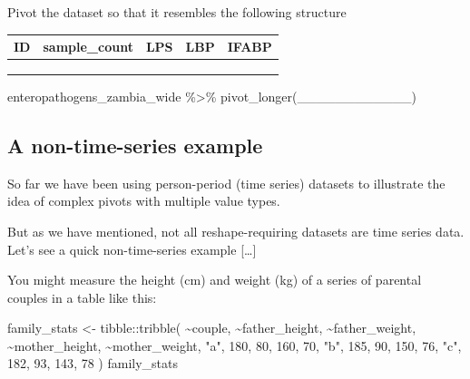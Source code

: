 \documentclass[
  letterpaper,
  DIV=11,
  numbers=noendperiod]{scrreprt}
\newenvironment{Shaded}{\begin{snugshade}}{\end{snugshade}}
\newcommand{\DecValTok}[1]{\textcolor[rgb]{0.68,0.00,0.00}{#1}}
\newcommand{\FunctionTok}[1]{\textcolor[rgb]{0.28,0.35,0.67}{#1}}
\newcommand{\NormalTok}[1]{\textcolor[rgb]{0.00,0.23,0.31}{#1}}
\newcommand{\OtherTok}[1]{\textcolor[rgb]{0.00,0.23,0.31}{#1}}
\newcommand{\SpecialCharTok}[1]{\textcolor[rgb]{0.37,0.37,0.37}{#1}}
\newcommand{\StringTok}[1]{\textcolor[rgb]{0.13,0.47,0.30}{#1}}
\begin{document}
\begin{tcolorbox}
Pivot the dataset so that it resembles the following structure

\begin{longtable}[]{@{}lllll@{}}
\toprule\noalign{}
ID & sample\_count & LPS & LBP & IFABP \\
\midrule\noalign{}
\endhead
\bottomrule\noalign{}
\endlastfoot
& & & & \\
& & & & \\
& & & & \\
\end{longtable}

\begin{Shaded}
\begin{Highlighting}[]
\NormalTok{enteropathogens\_zambia\_wide }\SpecialCharTok{\%\textgreater{}\%} 
   \FunctionTok{pivot\_longer}\NormalTok{(\_\_\_\_\_\_\_\_\_\_\_\_)}
\end{Highlighting}
\end{Shaded}

\end{tcolorbox}

\subsection{A non-time-series example}\label{a-non-time-series-example}

So far we have been using person-period (time series) datasets to
illustrate the idea of complex pivots with multiple value types.

But as we have mentioned, not all reshape-requiring datasets are time
series data. Let's see a quick non-time-series example {[}\ldots{]}

You might measure the height (cm) and weight (kg) of a series of
parental couples in a table like this:

\begin{Shaded}
\begin{Highlighting}[]
\NormalTok{family\_stats }\OtherTok{\textless{}{-}} 
\NormalTok{  tibble}\SpecialCharTok{::}\FunctionTok{tribble}\NormalTok{(}
  \SpecialCharTok{\textasciitilde{}}\NormalTok{couple, }\SpecialCharTok{\textasciitilde{}}\NormalTok{father\_height, }\SpecialCharTok{\textasciitilde{}}\NormalTok{father\_weight, }\SpecialCharTok{\textasciitilde{}}\NormalTok{mother\_height, }\SpecialCharTok{\textasciitilde{}}\NormalTok{mother\_weight,}
      \StringTok{"a"}\NormalTok{,            }\DecValTok{180}\NormalTok{,            }\DecValTok{80}\NormalTok{,            }\DecValTok{160}\NormalTok{,             }\DecValTok{70}\NormalTok{,}
      \StringTok{"b"}\NormalTok{,            }\DecValTok{185}\NormalTok{,            }\DecValTok{90}\NormalTok{,            }\DecValTok{150}\NormalTok{,             }\DecValTok{76}\NormalTok{,}
      \StringTok{"c"}\NormalTok{,            }\DecValTok{182}\NormalTok{,            }\DecValTok{93}\NormalTok{,            }\DecValTok{143}\NormalTok{,             }\DecValTok{78}
\NormalTok{  )}
\NormalTok{family\_stats}
\end{Highlighting}
\end{Shaded}
\end{document}
